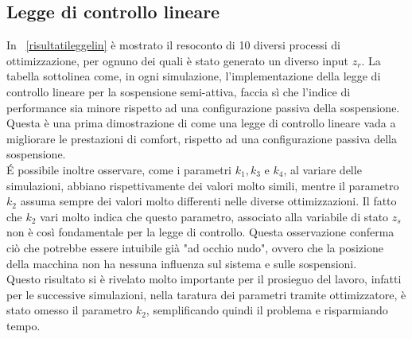\subsection{Legge di controllo lineare}
\label{lin}
In \tablename \ \ref{risultatileggelin} è mostrato il resoconto di 10 diversi processi di ottimizzazione, per ognuno dei quali è stato generato un diverso input $z_r$. La tabella sottolinea come, in ogni simulazione, l'implementazione della legge di controllo lineare per la sospensione semi-attiva, faccia sì che l'indice di performance sia minore rispetto ad una configurazione passiva della sospensione. Questa è una prima dimostrazione di come una legge di controllo lineare vada a migliorare le prestazioni di comfort, rispetto ad una configurazione passiva della sospensione.\\
\'E possibile inoltre osservare, come i parametri $k_1, k_3$ e $k_4$, al variare delle simulazioni, abbiano rispettivamente dei valori molto simili, mentre il  parametro $k_2$ assuma  sempre dei valori molto differenti nelle diverse ottimizzazioni. Il fatto che $k_2$ vari molto indica che questo parametro, associato alla variabile di stato $z_s$ non è così fondamentale per la legge di controllo. Questa osservazione conferma ciò che potrebbe essere intuibile già "ad occhio nudo", ovvero che la posizione della macchina non ha nessuna influenza sul sistema e sulle sospensioni.\\
Questo risultato si è rivelato molto importante per il prosieguo del lavoro, infatti per le successive simulazioni, nella taratura dei parametri tramite ottimizzatore, è stato omesso il parametro $k_2$, semplificando quindi il problema e risparmiando tempo.\\
\renewcommand\arraystretch{1.4} 
